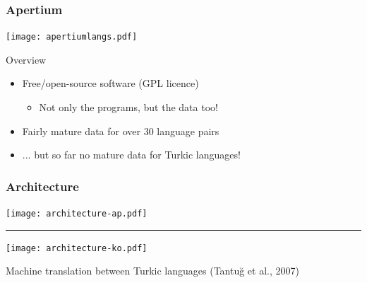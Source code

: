 \documentclass[10pt,xetex]{beamer} %
\begin{document}
\begin{frame}
  \frametitle{Apertium}

\begin{center}
  \texttt{[image: apertiumlangs.pdf]}%
\end{center}

\begin{block}{Overview}
  
  \begin{itemize}
    \item Free/open-source software (GPL licence)
    \begin{itemize}
      \item Not only the programs, but the data too!
    \end{itemize}
    \item Fairly mature data for over 30 language pairs
    \item ... but so far no mature data for Turkic languages!
  \end{itemize}
  
\end{block}


\end{frame}

\begin{frame}
  \frametitle{Architecture}

\texttt{[image: architecture-ap.pdf]} 
\vspace{1em}
\hrule
\vspace{1em}
\texttt{[image: architecture-ko.pdf]} 
\begin{flushright}
{\tiny Machine translation between Turkic languages (Tantuğ et al., 2007)}
\end{flushright}

\end{frame}
\end{document}
